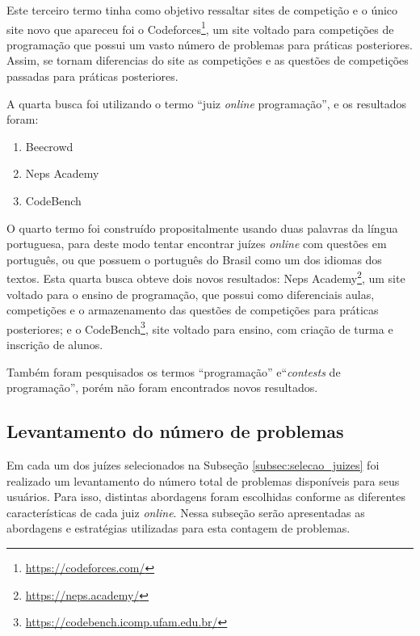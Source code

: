 Este terceiro termo tinha como objetivo ressaltar sites de competição e o único site novo que apareceu foi o Codeforces\footnote{\url{https://codeforces.com/}}, um site voltado para competições de programação que possui um vasto número de problemas para práticas posteriores. Assim, se tornam diferencias do site as competições e as questões de competições passadas para práticas posteriores.

A quarta busca foi utilizando o termo ``juiz \textit{online} programação'', e os resultados foram:

\begin{enumerate}
    \item Beecrowd
    \item Neps Academy 
    \item CodeBench
\end{enumerate}

O quarto termo foi construído propositalmente usando duas palavras da língua portuguesa, para deste modo tentar encontrar juízes \textit{online} com questões em português, ou que possuem o português do Brasil como um dos idiomas dos textos. Esta quarta busca obteve dois novos resultados: Neps Academy\footnote{\url{https://neps.academy/}}, um site voltado para o ensino de programação, que possui como diferenciais aulas, competições e o armazenamento das questões de competições para práticas posteriores; e o CodeBench\footnote{\url{https://codebench.icomp.ufam.edu.br/}}, site voltado para ensino, com criação de turma e inscrição de alunos. 

Também foram pesquisados os termos ``programação'' e``\textit{contests} de programação'', porém não foram encontrados novos resultados.

\subsection{Levantamento do número de problemas}
\label{subsec:levantamento_numero_de_problemas}

Em cada um dos juízes selecionados na Subseção \ref{subsec:selecao_juizes} foi realizado um levantamento do número total de problemas disponíveis para seus usuários. Para isso, distintas abordagens foram escolhidas conforme as diferentes características de cada juiz \textit{online}. Nessa subseção serão apresentadas as abordagens e estratégias utilizadas para esta contagem de problemas.

